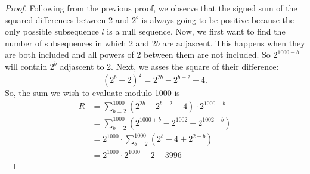 \documentclass[11pt]{scrartcl}
\begin{document}
\begin{soln}
    \begin{proof}
        Following from the previous proof, we observe that the signed sum of the squared differences between 2 and $2^{b}$ is always going to be positive because the only possible subsequence $l$ is a null sequence. Now, we first want to find the number of subsequences in which 2 and $2{b}$ are adjascent. This happens when they are both included and all powers of 2 between them are not included. So $2^{1000 - b}$ will contain $2^{b}$ adjascent to 2. Next, we asses the square of their difference:
        \[(2^{b} - 2)^{2} = 2^{2b} - 2^{b + 2} + 4.\]
        So, the sum we wish to evaluate modulo 1000 is
        \begin{align*}
            R &= \sum_{b = 2}^{1000} (2^{2b} - 2^{b + 2} + 4) \cdot 2^{1000 - b} \\
            &= \sum_{b = 2}^{1000} (2^{1000 + b} - 2^{1002} + 2^{1002 - b}) \\
            &= 2^{1000} \cdot \sum_{b = 2}^{1000} (2^{b} - 4 + 2^{2 - b}) \\
            &= 2^{1000} \cdot 2^{1000} - 2 - 3996
        \end{align*}
        
    \end{proof}
\end{soln}
\end{document}

